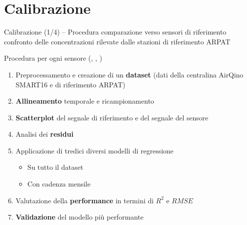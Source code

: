 \section{Calibrazione}

\begin{frame}{Calibrazione (1/4) – Procedura}
comparazione verso sensori di riferimento
confronto delle concentrazioni rilevate dalle stazioni di riferimento ARPAT
\begin{block}{Procedura per ogni sensore (, , )}
\begin{enumerate}
  \item Preprocessamento e creazione di un \textbf{dataset} (dati della centralina AirQino SMART16 e di riferimento ARPAT)
  \item \textbf{Allineamento} temporale e ricampionamento
  \item \textbf{Scatterplot} del segnale di riferimento e del segnale del sensore
  \item Analisi dei \textbf{residui}
  \item Applicazione di tredici diversi modelli di \alert{regressione}
  \begin{itemize}
    \item Su tutto il dataset
    \item Con cadenza mensile
  \end{itemize}
  \item Valutazione della \textbf{performance} in termini di $R^2$ e $RMSE$
  \item \textbf{Validazione} del modello più performante\vspace{0.1cm}
\end{enumerate}
\end{block}

\end{frame}

